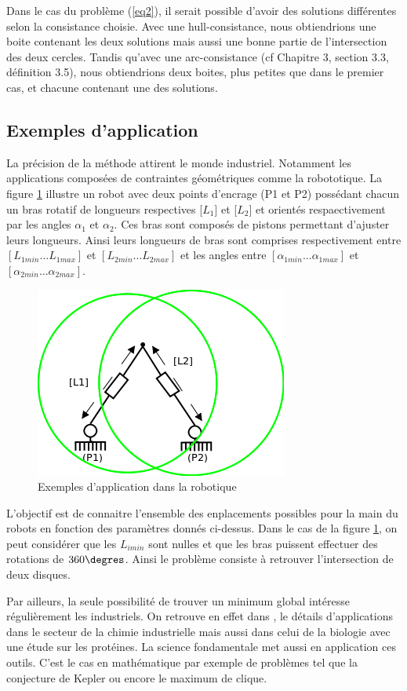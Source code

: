Dans le cas du problème (\ref{eq2}), il serait possible d'avoir des solutions différentes selon la consistance choisie. Avec une hull-consistance, nous obtiendrions une boite contenant les deux solutions mais aussi une bonne partie de l'intersection des deux cercles. Tandis qu'avec une arc-consistance (cf \cite{Goualard} Chapitre 3, section 3.3, définition 3.5), nous obtiendrions deux boites, plus petites que dans le premier cas, et chacune contenant une des solutions.


\subsection{Exemples d'application}

La précision de la méthode attirent le monde industriel. Notamment les applications composées de contraintes géométriques comme la robototique. La figure \ref{fig:rob} illustre un robot avec deux points d'encrage (P1 et P2) possédant chacun un bras rotatif de longueurs respectives [$L_1$] et [$L_2$] et orientés respaectivement par les angles $\alpha_1$ et $\alpha_2$. Ces bras sont composés de pistons permettant d'ajuster leurs longueurs. Ainsi leurs longueurs de bras sont comprises respectivement entre $[L_{1min} \dots L_{1max}]$ et $[L_{2min} \dots L_{2max}]$ et les angles entre $[\alpha_{1min} \dots \alpha_{1max}]$ et $[\alpha_{2min} \dots \alpha_{2max}]$.  

\begin{figure}[h] %
  \center
\includegraphics[scale=0.80]{img/robot2}
  \caption{Exemples d'application dans la robotique} %
 \label{fig:rob} %
\end{figure} %
L'objectif est de connaitre l'ensemble des enplacements possibles pour la main du robots en fonction des paramètres donnés ci-dessus. Dans le cas de la figure \ref{fig:rob}, on peut considérer que les $L_{imin}$ sont nulles et que les bras puissent effectuer des rotations de $360 \degres$. Ainsi le problème consiste à retrouver l'intersection de deux disques. 

  Par ailleurs, la seule possibilité de trouver un minimum global intéresse régulièrement les industriels. On retrouve en effet dans \cite{Schichl}, le détails d'applications dans le secteur de la chimie industrielle mais aussi dans celui de la biologie avec une étude sur les protéines.
 La science fondamentale met aussi en application ces outils. C'est le cas en mathématique par exemple de problèmes tel que la conjecture de Kepler ou encore le  maximum de clique.

\clearpage